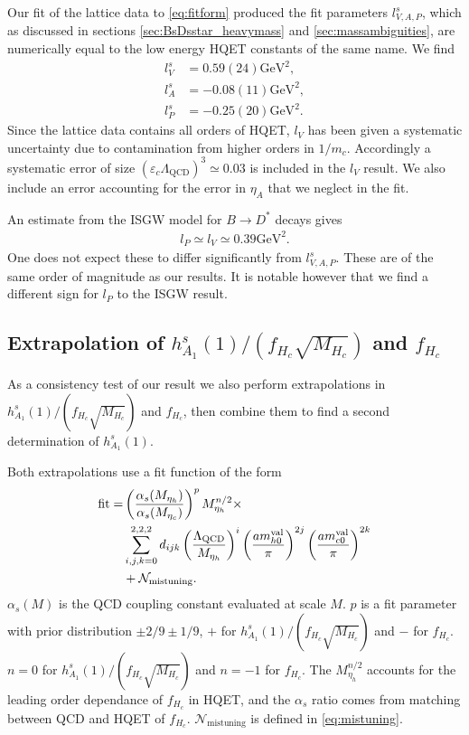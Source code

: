 Our fit of the lattice data to \eqref{eq:fitform} produced the fit parameters $l^s_{V,A,P}$, which as discussed in sections \ref{sec:BsDsstar_heavymass} and \ref{sec:massambiguities}, are numerically equal to the low energy HQET constants of the same name. We find
\begin{align}
  \nonumber  l^s_V &= 0.59(24)\text{GeV}^2, \\  l^s_A &= -0.08(11)\text{GeV}^2, \label{eq:hqet_constants}
  \\ \nonumber l^s_P &= -0.25(20)\text{GeV}^2.
\end{align}
Since the lattice data contains all orders of HQET, $l_V$ has been given a systematic uncertainty due to contamination from higher orders in $1/m_c$. Accordingly a systematic error of size $(\varepsilon_c \Lambda_{\text{QCD}})^3 \simeq 0.03$ is included in the $l_V$ result. We also include an error accounting for the error in $\eta_A$ that we neglect in the fit.

An estimate from the ISGW model for $B\to D^*$ decays gives \cite{PhysRevD.39.799}
\begin{align}
  l_P \simeq l_V \simeq 0.39\text{GeV}^2.
\end{align}
One does not expect these to differ significantly from $l_{V,A,P}^s$. These are of the same order of magnitude as our results. It is notable however that we find a different sign for $l_P$ to the ISGW result.

\subsection{Extrapolation of $h_{A_1}^s(1)/(f_{H_c}\sqrt{M_{H_c}})$ and $f_{H_c}$}
\label{sec:ratio_extrap}

As a consistency test of our result we also perform extrapolations in $h_{A_1}^s(1)/(f_{H_c}\sqrt{M_{H_c}})$ and $f_{H_c}$, then combine them to find a second determination of $h_{A_1}^s(1)$.

Both extrapolations use a fit function of the form
\begin{align}
  \label{eq:fitfun_ratio}
  \nonumber
  \text{fit} = &\left({\alpha_s(M_{\eta_h})\over\alpha_s(M_{\eta_c})}\right)^p M_{\eta_h}^{n/2} \times \\ &\sum_{i,j,k=0}^{2,2,2} d_{ijk} \left({\Lambda_{\text{QCD}}\over M_{\eta_h} }\right)^{i} \left({ am^{\text{val}}_{h0} \over \pi }\right)^{2j} \left({ am^{\text{val}}_{c0} \over \pi }\right)^{2k} \\
  &+ \mathcal{N}_{\text{mistuning}}.
  \nonumber
\end{align}
$\alpha_s(M)$ is the QCD coupling constant evaluated at scale $M$. $p$ is a fit parameter with prior distribution $\pm2/9\pm 1/9$, $+$ for $h_{A_1}^s(1)/(f_{H_c}\sqrt{M_{H_c}})$ and $-$ for $f_{H_c}$. $n=0$ for $h_{A_1}^s(1)/(f_{H_c}\sqrt{M_{H_c}})$ and $n=-1$ for $f_{H_c}$. The $M_{\eta_h}^{n/2}$ accounts for the leading order dependance of $f_{H_c}$ in HQET, and the $\alpha_s$ ratio comes from matching between QCD and HQET of $f_{H_c}$. $\mathcal{N}_{\text{mistuning}}$ is defined in \ref{eq:mistuning}.

